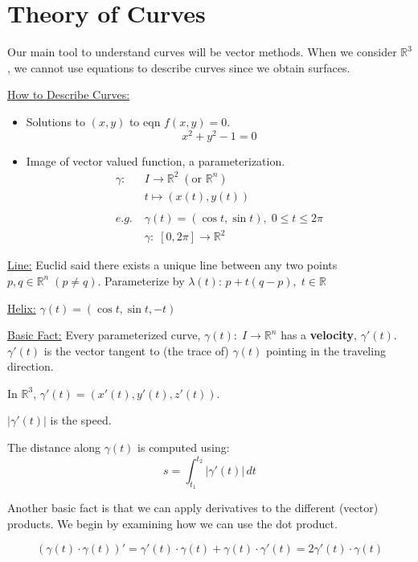 \documentclass[../main.tex]{subfiles}
\begin{document}
    
\section{Theory of Curves}

Our main tool to understand curves will be vector methods.
When we consider \( \mathbb{R}^3 \), we cannot use equations to describe curves since we obtain surfaces.

\underline{How to Describe Curves:}
\begin{itemize}
    \item Solutions to \( (x,y) \) to eqn \( f(x,y)=0 \).
            \[ x^2+y^2-1 =0 \]
    \item Image of vector valued function, a parameterization.
            \begin{align*}
                \gamma: \; & I \rightarrow \mathbb{R}^2 \; (\text{or } \mathbb{R}^n) \\
                & t \mapsto ( x(t),y(t) ) \\
                \\
                e.g. \; & \gamma(t) = (\cos t, \sin t), \; 0 \leq t \leq 2\pi \\
                & \gamma: \; [0,2\pi] \rightarrow \mathbb{R}^2
            \end{align*}            
\end{itemize}

\begin{example}[Parameterization]
    \underline{Line:} Euclid said there exists a unique line between any two points \( p,q \in \mathbb{R}^n \; (p \neq q) \).
    Parameterize by \( \lambda(t) \): \( p + t(q-p), \; t \in \mathbb{R} \)

    \underline{Helix:} \( \gamma(t) = (\cos t, \sin t, -t) \)
\end{example}

\underline{Basic Fact:} Every parameterized curve, \( \gamma(t): \; I \rightarrow \mathbb{R}^n \) has a \textbf{velocity}, \( \gamma'(t) \).
\( \gamma'(t) \) is the vector tangent to (the trace of) \( \gamma(t) \) pointing in the traveling direction.

In \( \mathbb{R}^3 \), \( \gamma'(t) = ( x'(t), y'(t), z'(t) ) \).

\( |\gamma'(t)| \) is the speed.

The distance along \( \gamma(t) \) is computed using:
\[ s = \int_{t_1}^{t_2} |\gamma'(t)| \,dt \]

Another basic fact is that we can apply derivatives to the different (vector) products.
We begin by examining how we can use the dot product.

\[ (\gamma(t) \cdot \gamma(t))' = \gamma'(t) \cdot \gamma(t) + \gamma(t) \cdot \gamma'(t) = 2\gamma'(t) \cdot \gamma(t) \]
\end{document}
